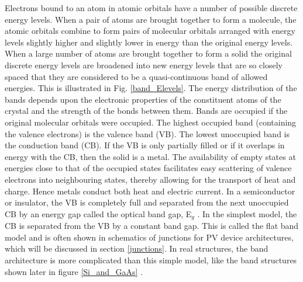 \documentclass[11pt, twoside]{report}
\begin{document}
Electrons bound to an atom in atomic orbitals have a number of possible discrete energy levels. When a pair of atoms are brought together to form a molecule, the atomic orbitals combine to form pairs of molecular orbitals arranged with energy levels slightly higher and slightly lower in energy than the original energy levels. When a large number of atoms are brought together to form a solid the 
original discrete energy levels are broadened into new energy levels that are so closely spaced that they are considered to be a quasi-continuous band of allowed energies. This is illustrated in Fig. \ref{band_Elevels}. The energy distribution of the bands depends upon the electronic properties of the constituent atoms of the crystal and the strength of the bonds between them. Bands are occupied if the original molecular orbitals were occupied. The highest occupied band (containing the valence electrons) is the valence band (VB). The lowest unoccupied band is the conduction band (CB). If the VB is only partially filled or if it overlaps in energy with the CB, then the solid is a metal. The availability of empty states at energies close to that of the occupied states facilitates easy scattering of valence electrons into neighbouring states, thereby allowing for the transport of heat and charge. Hence metals conduct both heat and electric current. In a semiconductor or insulator, the VB is completely full and separated from the next unoccupied CB by an energy gap called the optical band gap, E$_g$ \cite{Nelson3}. In the simplest model, the CB is separated from the VB by a constant band gap. This is called the flat band model and is often shown in schematics of junctions for PV device architectures, which will be discussed in section \ref{junctions}. In real structures, the band architecture is more complicated than this simple model, like the band structures shown later in figure \ref{Si_and_GaAs} \cite{Tilley}.
\end{document}

